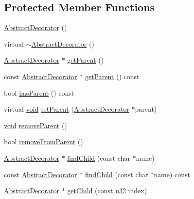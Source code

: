\subsection*{Protected Member Functions}
\begin{DoxyCompactItemize}
\item 
\mbox{\hyperlink{classnjli_1_1_abstract_decorator_aeebcf1e20165c7d17da774f57eb2a989}{Abstract\+Decorator}} ()
\item 
virtual \mbox{\hyperlink{classnjli_1_1_abstract_decorator_a8c5ac466e74e908ecc8286af04937d72}{$\sim$\+Abstract\+Decorator}} ()
\item 
\mbox{\hyperlink{classnjli_1_1_abstract_decorator}{Abstract\+Decorator}} $\ast$ \mbox{\hyperlink{classnjli_1_1_abstract_decorator_a02e7976cdd7bcc8852e2e6b6dcc5b7ac}{get\+Parent}} ()
\item 
const \mbox{\hyperlink{classnjli_1_1_abstract_decorator}{Abstract\+Decorator}} $\ast$ \mbox{\hyperlink{classnjli_1_1_abstract_decorator_a5a27f06290d6561218c1932ee4f0bb1c}{get\+Parent}} () const
\item 
bool \mbox{\hyperlink{classnjli_1_1_abstract_decorator_ae68a7fd88bfd50c2d3dd7831f9e95e09}{has\+Parent}} () const
\item 
virtual \mbox{\hyperlink{_thread_8h_af1e856da2e658414cb2456cb6f7ebc66}{void}} \mbox{\hyperlink{classnjli_1_1_abstract_decorator_a292c49c95d3fd287d0e4799554288520}{set\+Parent}} (\mbox{\hyperlink{classnjli_1_1_abstract_decorator}{Abstract\+Decorator}} $\ast$parent)
\item 
\mbox{\hyperlink{_thread_8h_af1e856da2e658414cb2456cb6f7ebc66}{void}} \mbox{\hyperlink{classnjli_1_1_abstract_decorator_a5ef875734a96eca9b3c7aa3be482ff29}{remove\+Parent}} ()
\item 
bool \mbox{\hyperlink{classnjli_1_1_abstract_decorator_a04b797ac24b5de658d1e6dc165167d8f}{remove\+From\+Parent}} ()
\item 
\mbox{\hyperlink{classnjli_1_1_abstract_decorator}{Abstract\+Decorator}} $\ast$ \mbox{\hyperlink{classnjli_1_1_abstract_decorator_a8bdc7cebaaeae22a9519a8839ff3eba0}{find\+Child}} (const char $\ast$name)
\item 
const \mbox{\hyperlink{classnjli_1_1_abstract_decorator}{Abstract\+Decorator}} $\ast$ \mbox{\hyperlink{classnjli_1_1_abstract_decorator_af924f47defa4cd007308847e1c6d9c2a}{find\+Child}} (const char $\ast$name) const
\item 
\mbox{\hyperlink{classnjli_1_1_abstract_decorator}{Abstract\+Decorator}} $\ast$ \mbox{\hyperlink{classnjli_1_1_abstract_decorator_ab4685efa1283c203aabd7e8b4aa86fb4}{get\+Child}} (const \mbox{\hyperlink{_util_8h_a10e94b422ef0c20dcdec20d31a1f5049}{u32}} index)

\end{DoxyCompactItemize}
